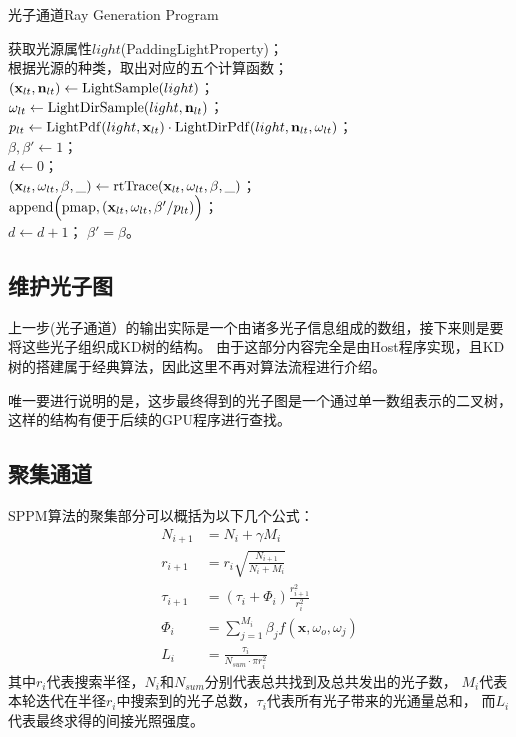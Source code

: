 \begin{algorithm}
    \caption{光子通道Ray Generation Program}
    \label{RGPPPass}

    获取光源属性$light$(PaddingLightProperty)；\\
    根据光源的种类，取出对应的五个计算函数；\\
    $(\textbf{x}_{lt}, \textbf{n}_{lt}) \leftarrow {\rm LightSample}(light)$； \\
    $\omega_{lt} \leftarrow {\rm LightDirSample}(light, \textbf{n}_{lt})$； \\
    $p_{lt} \leftarrow {\rm LightPdf}(light, \textbf{x}_{lt})\cdot {\rm LightDirPdf}(light, \textbf{n}_{lt}, \omega_{lt})$； \\
    $\beta, \beta' \leftarrow 1$；\\    
    $d \leftarrow 0$；\\
    {
        $(\textbf{x}_{lt}, \omega_{lt}, \beta, \_) \leftarrow {\rm rtTrace}(\textbf{x}_{lt}, \omega_{lt}, \beta, \_)$；\\
        {    
            ${\rm append}\Big({\rm pmap}, (\textbf{x}_{lt}, \omega_{lt}, \beta' / p_{lt})\Big)$；\\
            $d \leftarrow d+1$；
        }
        $\beta' = \beta$。
    }

\end{algorithm}

\subsection{维护光子图}
上一步(光子通道）的输出实际是一个由诸多光子信息组成的数组，接下来则是要将这些光子组织成KD树的结构。
由于这部分内容完全是由Host程序实现，且KD树的搭建属于经典算法，因此这里不再对算法流程进行介绍。

唯一要进行说明的是，这步最终得到的光子图是一个通过单一数组表示的二叉树，
这样的结构有便于后续的GPU程序进行查找。

\subsection{聚集通道}

SPPM算法的聚集部分可以概括为以下几个公式：
\begin{align}
    N_{i+1} &= N_{i}+\gamma M_i \label{SPPM1}\\
    r_{i+1} &= r_i\sqrt{\frac{N_{i+1}}{N_i+M_i}} \label{SPPM2}\\
    \tau_{i+1} &= (\tau_i+\Phi_i)\frac{r_{i+1}^2}{r_i^2} \label{SPPM3}\\
    \Phi_i &= \sum_{j = 1}^{M_i}\beta_jf(\textbf{x},\omega_o, \omega_j) \\
    L_i &= \frac{\tau_i}{N_{sum}\cdot \pi r_i^2}  
\end{align}
其中$r_i$代表搜索半径，$N_i$和$N_{sum}$分别代表总共找到及总共发出的光子数，
$M_i$代表本轮迭代在半径$r_i$中搜索到的光子总数，$\tau_i$代表所有光子带来的光通量总和，
而$L_i$代表最终求得的间接光照强度。

